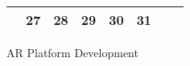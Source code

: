 {\begin{tabularx}{\linewidth}{|l!{\vrule width \myLenLineThicknessThick}*{7}{@{}X@{}|}}
       & 
    
      
      
        \begin{minipage}[t]{6mm}\centering{}27\end{minipage}
      
       & 
    
      
      
        \begin{minipage}[t]{6mm}\centering{}28\end{minipage}
      
       & 
    
      
      
        \begin{minipage}[t]{6mm}\centering{}29\end{minipage}
      
       & 
    
      
      
        \begin{minipage}[t]{6mm}\centering{}30\end{minipage}
      
       & 
    
      
      
        \begin{minipage}[t]{6mm}\centering{}31\end{minipage}
      
      
        \\  \hline 
      
    
  
  
  \end{tabularx}
}
\vfill{\centering{} \small{AR Platform Development}\hspace{ 1.5em }\par}


